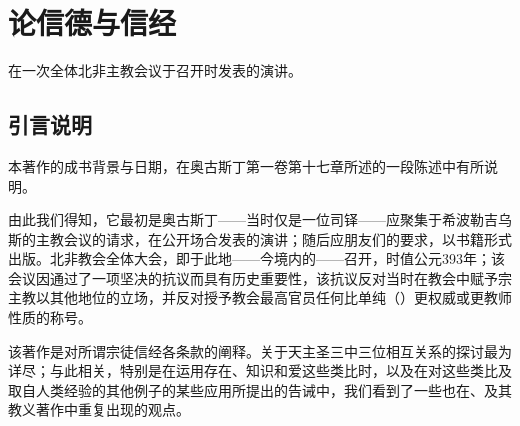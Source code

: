 
\chapter{论信德与信经}


在一次全体北非主教会议于召开时发表的演讲。\par


\section{引言说明}

本著作的成书背景与日期，在奥古斯丁第一卷第十七章所述的一段陈述中有所说明。\par

由此我们得知，它最初是奥古斯丁——当时仅是一位司铎——应聚集于希波勒吉乌斯的主教会议的请求，在公开场合发表的演讲；随后应朋友们的要求，以书籍形式出版。北非教会全体大会，即于此地——今境内的——召开，时值公元393年；该会议因通过了一项坚决的抗议而具有历史重要性，该抗议反对当时在教会中赋予宗主教以其他地位的立场，并反对授予教会最高官员任何比单纯（）更权威或更教师性质的称号。\par

该著作是对所谓宗徒信经各条款的阐释。关于天主圣三中三位相互关系的探讨最为详尽；与此相关，特别是在运用存在、知识和爱这些类比时，以及在对这些类比及取自人类经验的其他例子的某些应用所提出的告诫中，我们看到了一些也在、及其教义著作中重复出现的观点。\par

